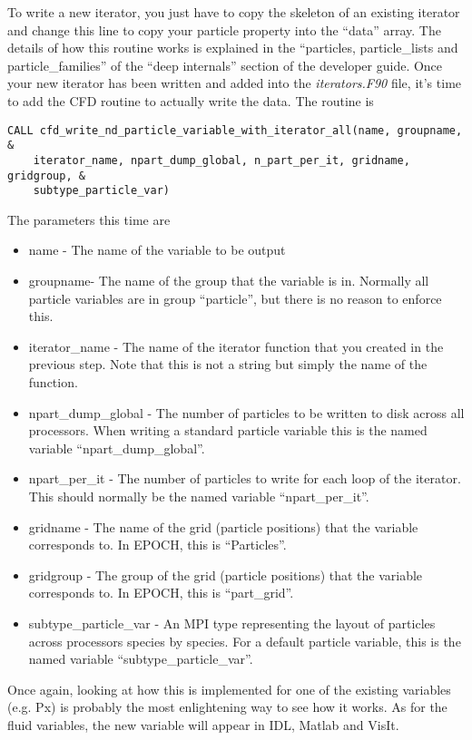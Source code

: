 \documentclass[12pt,a4paper]{article}
\newcommand{\simpleboxverbatim}{\begin{Verbatim}[obeytabs=true,frame=single,
  framerule=0.5mm,rulecolor=\color{warwickmid},formatcom=\color{black}]}
\newcommand{\EPOCH}{{\color{warwickdark}\fontfamily{phv}\selectfont{EPOCH}}}
\begin{document}
To write a new iterator, you just have to copy the skeleton of an existing
iterator and change this line to copy your particle property into the ``data''
array. The details of how this routine works is explained in the ``particles,
particle\_lists and particle\_families'' of the ``deep internals'' section of
the developer guide. Once your new iterator has been written and added into the
{\it iterators.F90} file, it's time to add the CFD routine to actually write
the data. The routine is
\simpleboxverbatim
CALL cfd_write_nd_particle_variable_with_iterator_all(name, groupname, &
    iterator_name, npart_dump_global, n_part_per_it, gridname, gridgroup, &
    subtype_particle_var)
\end{Verbatim}

The parameters this time are
\begin{itemize}
\item name - The name of the variable to be output
\item groupname- The name of the group that the variable is in. Normally all
  {\EPOCH} particle variables are in group ``particle'', but there is no reason
  to enforce this.
\item iterator\_name - The name of the iterator function that you created in
  the previous step. Note that this is not a string but simply the name of the
  function.
\item npart\_dump\_global - The number of particles to be written to disk
  across all processors. When writing a standard particle variable this is the
  named variable ``npart\_dump\_global''.
\item npart\_per\_it - The number of particles to write for each loop of the
  iterator. This should normally be the named variable ``npart\_per\_it''.
\item gridname - The name of the grid (particle positions) that the variable
  corresponds to. In EPOCH, this is ``Particles''.
\item gridgroup - The group of the grid (particle positions) that the variable
  corresponds to. In EPOCH, this is ``part\_grid''.
\item subtype\_particle\_var - An MPI type representing the layout of particles
  across processors species by species. For a default particle variable, this
  is the named variable ``subtype\_particle\_var''.
\end{itemize}

Once again, looking at how this is implemented for one of the existing
variables (e.g. Px) is probably the most enlightening way to see how it
works. As for the fluid variables, the new variable will appear in IDL, Matlab
and VisIt.
\end{document}
